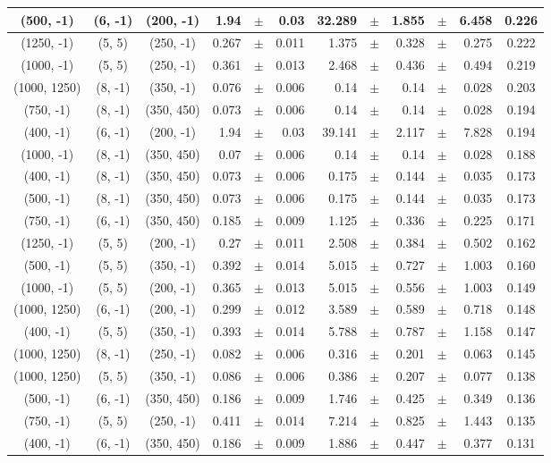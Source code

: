 \documentclass[12pt]{paper}
\begin{document}
\begin{table}[ht]
\begin{center}
{\begin{tabular}{|c|c|c|rrr|rrrrr|c|}
(500, -1)&(6, -1)&(200, -1)&1.94&$\pm$&0.03&32.289&$\pm$&1.855&$\pm$&6.458&0.226\\\hline
(1250, -1)&(5, 5)&(250, -1)&0.267&$\pm$&0.011&1.375&$\pm$&0.328&$\pm$&0.275&0.222\\\hline
(1000, -1)&(5, 5)&(250, -1)&0.361&$\pm$&0.013&2.468&$\pm$&0.436&$\pm$&0.494&0.219\\\hline
(1000, 1250)&(8, -1)&(350, -1)&0.076&$\pm$&0.006&0.14&$\pm$&0.14&$\pm$&0.028&0.203\\\hline
(750, -1)&(8, -1)&(350, 450)&0.073&$\pm$&0.006&0.14&$\pm$&0.14&$\pm$&0.028&0.194\\\hline
(400, -1)&(6, -1)&(200, -1)&1.94&$\pm$&0.03&39.141&$\pm$&2.117&$\pm$&7.828&0.194\\\hline
(1000, -1)&(8, -1)&(350, 450)&0.07&$\pm$&0.006&0.14&$\pm$&0.14&$\pm$&0.028&0.188\\\hline
(400, -1)&(8, -1)&(350, 450)&0.073&$\pm$&0.006&0.175&$\pm$&0.144&$\pm$&0.035&0.173\\\hline
(500, -1)&(8, -1)&(350, 450)&0.073&$\pm$&0.006&0.175&$\pm$&0.144&$\pm$&0.035&0.173\\\hline
(750, -1)&(6, -1)&(350, 450)&0.185&$\pm$&0.009&1.125&$\pm$&0.336&$\pm$&0.225&0.171\\\hline
(1250, -1)&(5, 5)&(200, -1)&0.27&$\pm$&0.011&2.508&$\pm$&0.384&$\pm$&0.502&0.162\\\hline
(500, -1)&(5, 5)&(350, -1)&0.392&$\pm$&0.014&5.015&$\pm$&0.727&$\pm$&1.003&0.160\\\hline
(1000, -1)&(5, 5)&(200, -1)&0.365&$\pm$&0.013&5.015&$\pm$&0.556&$\pm$&1.003&0.149\\\hline
(1000, 1250)&(6, -1)&(200, -1)&0.299&$\pm$&0.012&3.589&$\pm$&0.589&$\pm$&0.718&0.148\\\hline
(400, -1)&(5, 5)&(350, -1)&0.393&$\pm$&0.014&5.788&$\pm$&0.787&$\pm$&1.158&0.147\\\hline
(1000, 1250)&(8, -1)&(250, -1)&0.082&$\pm$&0.006&0.316&$\pm$&0.201&$\pm$&0.063&0.145\\\hline
(1000, 1250)&(5, 5)&(350, -1)&0.086&$\pm$&0.006&0.386&$\pm$&0.207&$\pm$&0.077&0.138\\\hline
(500, -1)&(6, -1)&(350, 450)&0.186&$\pm$&0.009&1.746&$\pm$&0.425&$\pm$&0.349&0.136\\\hline
(750, -1)&(5, 5)&(250, -1)&0.411&$\pm$&0.014&7.214&$\pm$&0.825&$\pm$&1.443&0.135\\\hline
(400, -1)&(6, -1)&(350, 450)&0.186&$\pm$&0.009&1.886&$\pm$&0.447&$\pm$&0.377&0.131\\\hline

\end{tabular}}
\end{center}
\end{table}
\end{document}
